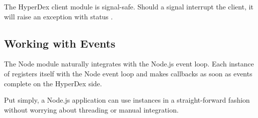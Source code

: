The HyperDex client module is signal-safe.  Should a signal interrupt the
client, it will raise an exception with status
.

\subsection{Working with Events}
\label{sec:api:node:threads}

The Node module naturally integrates with the Node.js event loop.  Each instance
of  registers itself with the Node event loop and makes callbacks
as soon as events complete on the HyperDex side.

Put simply, a Node.js application can use  instances in a
straight-forward fashion without worrying about threading or manual integration.
